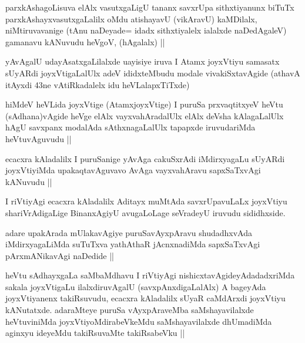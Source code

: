 \begin{artha}
parxkAshagoLisuva elAlx vasutxgaLigU tananx savxrUpa sithxtiyanunx biTuTx parxkAshayxvasutxgaLalilx oMdu atishayavU (vikAravU) kaMDilalx, niMtiruvavanige (tAnu naDeyade= idadx sithxtiyalelx ialalxde naDedAgaleV) gamanavu kANuvudu heVgoV, (hAgalalx) ||
\end{artha}

\begin{artha}
yAvAgalU udayAsatxgaLilalxde uayisiye iruva I Atamx joyxVtiyu samasatx sUyARdi joyxVtigaLalUlx adeV ididxteMbudu modale vivakiSxtavAgide (athavA itAyxdi 43ne vAtiRkadalelx idu heVLalapxTiTxde)
\end{artha}

\begin{artha}
hiMdeV heVLida joyxVtige (AtamxjoyxVtige) I puruSa prxvaqtitxyeV heVtu (sAdhana)vAgide heVge elAlx vayxvahAradalUlx elAlx deVsha kAlagaLalUlx hAgU savxpanx modalAda sAthxnagaLalUlx tapapxde iruvudariMda heVtuvAguvudu ||
\end{artha}

\begin{artha}
ecacxra kAladalilx I puruSanige yAvAga cakuSxrAdi iMdirxyagaLu sUyARdi joyxVtiyiMda upakaqtavAguvavo AvAga vayxvahAravu sapxSaTxvAgi kANuvudu ||
\end{artha}

\begin{artha}
I riVtiyAgi ecacxra kAladalilx Aditayx muMtAda savxrUpavuLaLx joyxVtiyu shariVrAdigaLige BinanxAgiyU avugaLoLage seVradeyU iruvudu sididhxside.
\end{artha}

\begin{artha}
adare upakArada mUlakavAgiye puruSavAyxpAravu shudadhxvAda iMdirxyagaLiMda suTuTxva yathAthaR jAcnxnadiMda sapxSaTxvAgi pArxmANikavAgi naDedide ||
\end{artha}

\begin{artha}
heVtu sAdhayxgaLa saMbaMdhavu I riVtiyAgi nishicxtavAgideyAdadadxriMda sakala joyxVtigaLu ilalxdiruvAgalU (savxpAnxdigaLalAlx) A bageyAda joyxVtiyanenx takiRsuvudu, ecacxra kAladalilx sUyaR caMdArxdi joyxVtiyu kANutatxde. adaraMteye puruSa vAyxpAraveMba saMshayavilalxde heVtuviniMda joyxVtiyoMdirabeVkeMdu saMshayavilalxde dhUmadiMda aginxyu ideyeMdu takiRsuvaMte takiRsabeVku ||
\end{artha}


